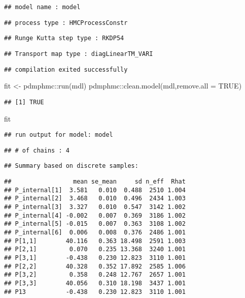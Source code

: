 \documentclass[
]{book}
\newenvironment{Shaded}{\begin{snugshade}}{\end{snugshade}}
\newcommand{\AttributeTok}[1]{\textcolor[rgb]{0.77,0.63,0.00}{#1}}
\newcommand{\ConstantTok}[1]{\textcolor[rgb]{0.00,0.00,0.00}{#1}}
\newcommand{\FunctionTok}[1]{\textcolor[rgb]{0.00,0.00,0.00}{#1}}
\newcommand{\NormalTok}[1]{#1}
\newcommand{\OtherTok}[1]{\textcolor[rgb]{0.56,0.35,0.01}{#1}}
\newcommand{\SpecialCharTok}[1]{\textcolor[rgb]{0.00,0.00,0.00}{#1}}
\begin{document}
\begin{verbatim}
## model name : model
\end{verbatim}

\begin{verbatim}
## process type : HMCProcessConstr
\end{verbatim}

\begin{verbatim}
## Runge Kutta step type : RKDP54
\end{verbatim}

\begin{verbatim}
## Transport map type : diagLinearTM_VARI
\end{verbatim}

\begin{verbatim}
## compilation exited successfully
\end{verbatim}

\begin{Shaded}
\begin{Highlighting}[]
\NormalTok{fit }\OtherTok{\textless{}{-}}\NormalTok{ pdmphmc}\SpecialCharTok{::}\FunctionTok{run}\NormalTok{(mdl)}
\NormalTok{pdmphmc}\SpecialCharTok{::}\FunctionTok{clean.model}\NormalTok{(mdl,}\AttributeTok{remove.all =} \ConstantTok{TRUE}\NormalTok{)}
\end{Highlighting}
\end{Shaded}

\begin{verbatim}
## [1] TRUE
\end{verbatim}

\begin{Shaded}
\begin{Highlighting}[]
\NormalTok{fit}
\end{Highlighting}
\end{Shaded}

\begin{verbatim}
## run output for model: model
\end{verbatim}

\begin{verbatim}
## # of chains : 4
\end{verbatim}

\begin{verbatim}
## Summary based on discrete samples:
\end{verbatim}

\begin{verbatim}
##                 mean se_mean     sd n_eff  Rhat
## P_internal[1]  3.581   0.010  0.488  2510 1.004
## P_internal[2]  3.468   0.010  0.496  2434 1.003
## P_internal[3]  3.327   0.010  0.547  3142 1.002
## P_internal[4] -0.002   0.007  0.369  3186 1.002
## P_internal[5] -0.015   0.007  0.363  3108 1.002
## P_internal[6]  0.006   0.008  0.376  2486 1.001
## P[1,1]        40.116   0.363 18.498  2591 1.003
## P[2,1]         0.070   0.235 13.368  3240 1.001
## P[3,1]        -0.438   0.230 12.823  3110 1.001
## P[2,2]        40.328   0.352 17.892  2585 1.006
## P[3,2]         0.358   0.248 12.767  2657 1.001
## P[3,3]        40.056   0.310 18.198  3437 1.001
## P13           -0.438   0.230 12.823  3110 1.001
\end{verbatim}
\end{document}

